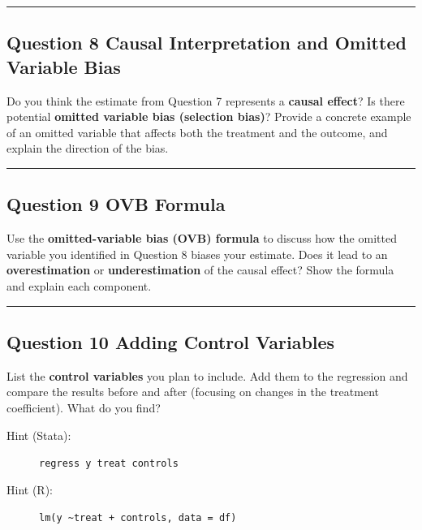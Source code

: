 \documentclass[paper=a4, fontsize=11pt]{scrartcl}
\newcommand{\horrule}[1]{\rule{\linewidth}{#1}}
\begin{document}
\bigskip\horrule{0.4pt}\bigskip


\subsection*{Question 8 \quad Causal Interpretation and Omitted Variable Bias}

Do you think the estimate from Question 7 represents a \textbf{causal effect}? Is there potential \textbf{omitted variable bias (selection bias)}? Provide a concrete example of an omitted variable that affects both the treatment and the outcome, and explain the direction of the bias.

\bigskip\horrule{0.4pt}\bigskip


\subsection*{Question 9 \quad OVB Formula}

Use the \textbf{omitted-variable bias (OVB) formula} to discuss how the omitted variable you identified in Question 8 biases your estimate. Does it lead to an \textbf{overestimation} or \textbf{underestimation} of the causal effect? Show the formula and explain each component.

\bigskip\horrule{0.4pt}\bigskip


\subsection*{Question 10 \quad Adding Control Variables}

List the \textbf{control variables} you plan to include. Add them to the regression and compare the results before and after (focusing on changes in the treatment coefficient). What do you find?

\begin{description}
  \item[Hint (Stata):] \texttt{regress y treat controls}
  \item[Hint (R):] \texttt{lm(y \textasciitilde treat + controls, data = df)}
\end{description}
\end{document}
